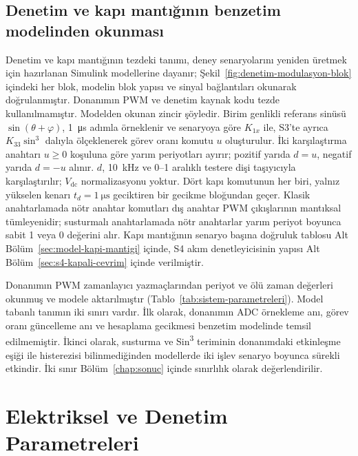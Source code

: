 \subsection{Denetim ve kapı mantığının benzetim modelinden okunması}
\label{sec:denetim-modelden}

Denetim ve kapı mantığının tezdeki tanımı, deney senaryolarını yeniden üretmek için hazırlanan Simulink modellerine dayanır; Şekil~\ref{fig:denetim-modulasyon-blok} içindeki her blok, modelin blok yapısı ve sinyal bağlantıları okunarak doğrulanmıştır. Donanımın PWM ve denetim kaynak kodu tezde kullanılmamıştır. Modelden okunan zincir şöyledir. Birim genlikli referans sinüsü $\sin(\theta+\varphi)$, \SI{1}{\micro\second} adımla örneklenir ve senaryoya göre $K_{1x}$ ile, S3'te ayrıca $K_{33}\sin^3$ dalıyla ölçeklenerek görev oranı komutu $u$ oluşturulur. İki karşılaştırma anahtarı $u\geq0$ koşuluna göre yarım periyotları ayırır; pozitif yarıda $d=u$, negatif yarıda $d=-u$ alınır. $d$, \SI{10}{\kilo\hertz} ve 0--1 aralıklı testere dişi taşıyıcıyla karşılaştırılır; $V_{\mathrm{dc}}$ normalizasyonu yoktur. Dört kapı komutunun her biri, yalnız yükselen kenarı $t_d=\SI{1}{\micro\second}$ geciktiren bir gecikme bloğundan geçer. Klasik anahtarlamada nötr anahtar komutları dış anahtar PWM çıkışlarının mantıksal tümleyenidir; susturmalı anahtarlamada nötr anahtarlar yarım periyot boyunca sabit 1 veya 0 değerini alır. Kapı mantığının senaryo başına doğruluk tablosu Alt Bölüm~\ref{sec:model-kapi-mantigi} içinde, S4 akım denetleyicisinin yapısı Alt Bölüm~\ref{sec:s4-kapali-cevrim} içinde verilmiştir.

Donanımın PWM zamanlayıcı yazmaçlarından periyot ve ölü zaman değerleri okunmuş ve modele aktarılmıştır (Tablo~\ref{tab:sistem-parametreleri}). Model tabanlı tanımın iki sınırı vardır. İlk olarak, donanımın ADC örnekleme anı, görev oranı güncelleme anı ve hesaplama gecikmesi benzetim modelinde temsil edilmemiştir. İkinci olarak, susturma ve Sin\textsuperscript{3} teriminin donanımdaki etkinleşme eşiği ile histerezisi bilinmediğinden modellerde iki işlev senaryo boyunca sürekli etkindir. İki sınır Bölüm~\ref{chap:sonuc} içinde sınırlılık olarak değerlendirilir.

\section{Elektriksel ve Denetim Parametreleri}

